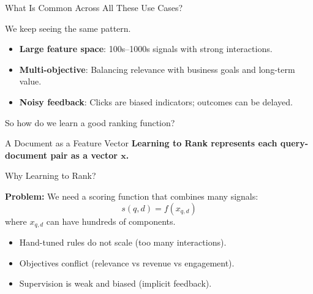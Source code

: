 \documentclass[aspectratio=169]{beamer}
\begin{document}

\begin{frame}{What Is Common Across All These Use Cases?}

\centering
\Large
We keep seeing the same pattern.

\bigskip
\pause

\begin{itemize}
  \item \textbf{Large feature space}: 100s--1000s signals with strong interactions.
  \item \textbf{Multi-objective}: Balancing relevance with business goals and long-term value.
  \item \textbf{Noisy feedback}: Clicks are biased indicators; outcomes can be delayed.
\end{itemize}

\bigskip
\pause
\centering
\alert{\Large So how do we learn a good ranking function?}
\end{frame}



\begin{frame}{A Document as a Feature Vector}
\textbf{Learning to Rank represents each query-document pair as a vector $\mathbf{x}$.}



\end{frame}

\begin{frame}{Why Learning to Rank?}

\textbf{Problem:} We need a scoring function that combines many signals:
\[
s(q,d) = f(x_{q,d})
\]
where $x_{q,d}$ can have hundreds of components.

\bigskip

\begin{itemize}
  \item Hand-tuned rules do not scale (too many interactions).
  \item Objectives conflict (relevance vs revenue vs engagement).
  \item Supervision is weak and biased (implicit feedback).
\end{itemize}

\bigskip
\centering
\end{frame}
\end{document}
